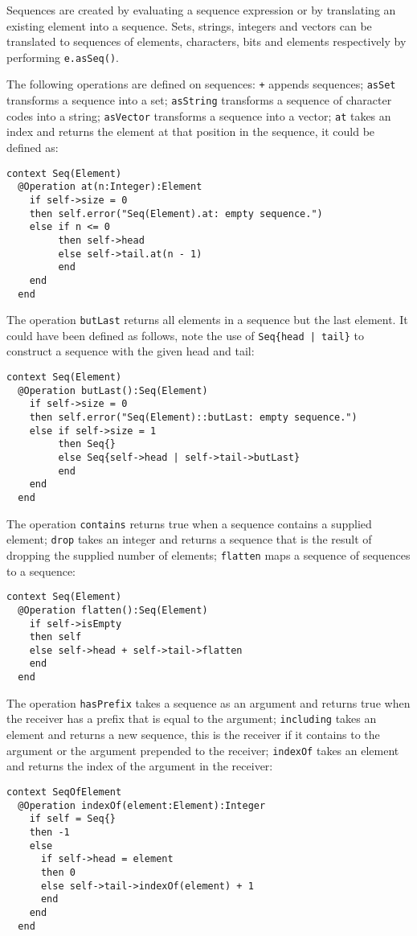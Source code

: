 \documentclass{article}
\begin{document}
Sequences are created by evaluating a sequence expression or by translating an existing element into 
a sequence. Sets, strings, integers and vectors can be translated to sequences of elements, characters,
bits and elements respectively by performing {\tt e.asSeq()}. 

The following operations are defined on sequences: {\tt +} appends sequences; {\tt asSet} transforms
a sequence into a set; {\tt asString} transforms a sequence of character codes into a string; {\tt asVector}
transforms a sequence into a vector; {\tt at} takes an index and returns the element at that position
in the sequence, it could be defined as:
\begin{verbatim}
context Seq(Element)
  @Operation at(n:Integer):Element
    if self->size = 0
    then self.error("Seq(Element).at: empty sequence.")
    else if n <= 0 
         then self->head
         else self->tail.at(n - 1)
         end
    end
  end  
\end{verbatim}
The operation {\tt butLast} returns all elements in a sequence but the last element. It could
have been defined as follows, note the use of {\tt Seq\{head | tail\}} to construct a sequence
with the given head and tail:
\begin{verbatim}
context Seq(Element)
  @Operation butLast():Seq(Element)
    if self->size = 0
    then self.error("Seq(Element)::butLast: empty sequence.")
    else if self->size = 1
         then Seq{}
         else Seq{self->head | self->tail->butLast}
         end
    end
  end
\end{verbatim}
The operation {\tt contains} returns true when a sequence contains a supplied element; {\tt drop}
takes an integer and returns a sequence that is the result of dropping the supplied number of elements;
{\tt flatten} maps a sequence of sequences to a sequence:
\begin{verbatim}
context Seq(Element)
  @Operation flatten():Seq(Element)
    if self->isEmpty
    then self
    else self->head + self->tail->flatten
    end
  end
\end{verbatim}
The operation {\tt hasPrefix} takes a sequence as an argument and returns true when the receiver has a
prefix that is equal to the argument; {\tt including} takes an element and returns a new sequence, this is
the receiver if it contains to the argument or the argument prepended to the receiver; {\tt indexOf} takes 
an element and returns the index of the argument in the receiver:
\begin{verbatim}
context SeqOfElement
  @Operation indexOf(element:Element):Integer
    if self = Seq{}
    then -1
    else 
      if self->head = element
      then 0
      else self->tail->indexOf(element) + 1
      end
    end
  end
\end{verbatim}
\end{document}
